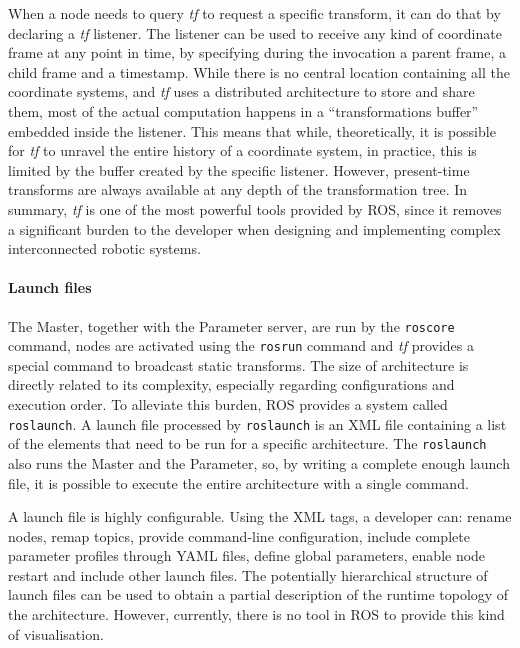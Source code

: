 When a node needs to query \textit{tf} to request a specific transform, it can do that by declaring a \textit{tf} listener. The listener can be used to receive any kind of coordinate frame at any point in time, by specifying during the invocation a parent frame, a child frame and a timestamp. While there is no central location containing all the coordinate systems, and \textit{tf} uses a distributed architecture to store and share them, most of the actual computation happens in a ``transformations buffer'' embedded inside the listener. This means that while, theoretically, it is possible for \textit{tf} to unravel the entire history of a coordinate system, in practice, this is limited by the buffer created by the specific listener. However, present-time transforms are always available at any depth of the transformation tree. In summary, \textit{tf} is one of the most powerful tools provided by ROS, since it removes a significant burden to the developer when designing and implementing complex interconnected robotic systems.

\paragraph{Launch files} The Master, together with the Parameter server, are run by the \texttt{roscore} command, nodes are activated using the \texttt{rosrun} command and \textit{tf} provides a special command to broadcast static transforms. The size of architecture is directly related to its complexity, especially regarding configurations and execution order. To alleviate this burden, ROS provides a system called \texttt{roslaunch}. A launch file processed by \texttt{roslaunch} is an XML file containing a list of the elements that need to be run for a specific architecture. The \texttt{roslaunch} also runs the Master and the Parameter, so, by writing a complete enough launch file, it is possible to execute the entire architecture with a single command.

A launch file is highly configurable. Using the XML tags, a developer can: rename nodes, remap topics, provide command-line configuration, include complete parameter profiles through YAML files, define global parameters, enable node restart and include other launch files. The potentially hierarchical structure of launch files can be used to obtain a partial description of the runtime topology of the architecture. However, currently, there is no tool in ROS to provide this kind of visualisation.

